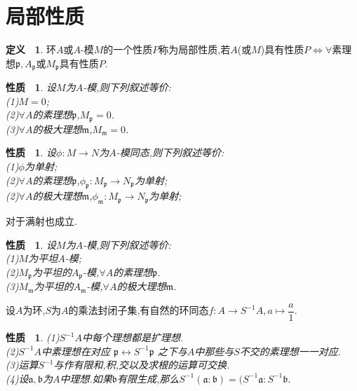 \documentclass[b5paper,oneside]{ctexbook}
\newcommand{\mf}[1]{\mathfrak{#1}}
\theoremstyle{plain}
\newtheorem{prop}[thm]{性质~}
\theoremstyle{definition}
\newtheorem{defn}[thm]{定义~}
\begin{document}
\section{局部性质}
\begin{defn}环$A$或$A$-模$M$的一个性质$P$称为局部性质,若$A$(或$M$)具有性质$P\Leftrightarrow \forall$素理想$\mf{p},A_{\mf{p}}$或$M_{\mf{p}}$具有性质$P$.
\end{defn}
\begin{prop}设$M$为$A$-模,则下列叙述等价:\\
(1)$M=0$;\\
(2)$\forall A$的素理想$\mf{p}$,$M_{\mf{p}}=0$.\\
(3)$\forall A$的极大理想$\mf{m}$,$M_{\mf{m}}=0$.
\end{prop}
\begin{prop}设$\phi:M\to N$为$A$-模同态,则下列叙述等价:\\
(1)$\phi$为单射;\\
(2)$\forall A$的素理想$\mf{p}$,$\phi_{\mf{p}}:M_{\mf{p}}\to N_{\mf{p}}$为单射;\\
(2)$\forall A$的极大理想$\mf{m}$,$\phi_{\mf{m}}:M_{\mf{p}}\to N_{\mf{p}}$为单射;
\end{prop}
对于满射也成立.
\begin{prop}设$M$为$A$-模,则下列叙述等价:\\
(1)$M$为平坦$A$-模;\\
(2)$M_{\mf{p}}$为平坦的$A_{\mf{p}}$-模,$\forall A$的素理想$\mf{p}$.\\
(3)$M_{\mf{m}}$为平坦的$A_{\mf{m}}$-模,$\forall A$的极大理想$\mf{m}$.
\end{prop}
设$A$为环,$S$为$A$的乘法封闭子集,有自然的环同态$f:A\to S^{-1}A,a\mapsto \dfrac{a}{1}.$
\begin{prop}
(1)$S^{−1}A$中每个理想都是扩理想.\\
(2)$S^{−1}A$中素理想在对应 $\mathfrak{p}\leftrightarrow  S^{−1}\mathfrak{p}$ 之下与$A$中那些与$S$不交的素理想一一对应.\\
(3)运算$S^{−1}$与作有限和,积,交以及求根的运算可交换.\\
(4)设$\mathfrak{a},\mathfrak{b}$为$A$中理想.如果$\mathfrak{b}$有限生成,那么$S^{−1}(\mathfrak{a}:\mathfrak{b})=(S^{−1}\mathfrak{a} :S^{−1}\mathfrak{b}.$
\end{prop}
\end{document}
